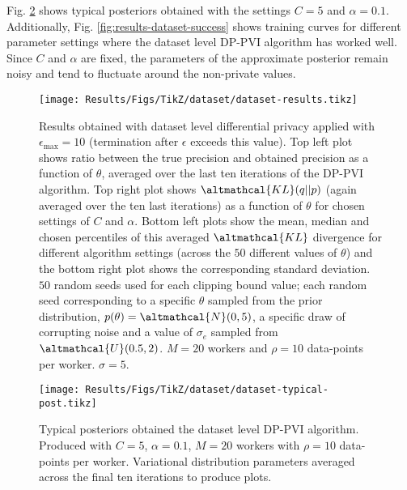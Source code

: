 Fig. \ref{fig:results-dataset-typical-post} shows typical posteriors obtained with the settings $C = 5$ and $\alpha = 0.1$. Additionally, Fig. \ref{fig:results-dataset-success} shows training curves for different parameter settings where the dataset level DP-PVI algorithm has worked well. Since $C$ and $\alpha$ are fixed, the parameters of the approximate posterior remain noisy and tend to fluctuate around the non-private values. 

\begin{figure}
	\texttt{[image: Results/Figs/TikZ/dataset/dataset-results.tikz]}
	\centering
	\caption{\label{fig:results-dataset-results} Results obtained with dataset level differential privacy applied with $\epsilon_\text{max} = 10$ (termination after $\epsilon$ exceeds this value). Top left plot shows ratio between the true precision and obtained precision as a function of $\theta$, averaged over the last ten iterations of the DP-PVI algorithm. Top right plot shows $\altmathcal{KL}(q||p)$ (again averaged over the ten last iterations) as a function of $\theta$ for chosen settings of $C$ and $\alpha$. Bottom left plots show the mean, median and chosen percentiles of this averaged $\altmathcal{KL}$ divergence for different algorithm settings (across the $50$ different values of $\theta$) and the bottom right plot shows the corresponding standard deviation. $50$ random seeds used for each clipping bound value; each random seed corresponding to a specific $\theta$ sampled from the prior distribution, $p(\theta) = \altmathcal{N}(0, 5)$, a specific draw of corrupting noise and a value of $\sigma_e$ sampled from $\altmathcal{U}(0.5, 2)$. $M=20$ workers and $\rho = 10$ data-points per worker. $\sigma=5$. }
\end{figure}

\begin{figure}
	\texttt{[image: Results/Figs/TikZ/dataset/dataset-typical-post.tikz]}
	\centering
	\caption{\label{fig:results-dataset-typical-post} Typical posteriors obtained the dataset level DP-PVI algorithm. Produced with $C=5$, $\alpha=0.1$, $M=20$ workers with $\rho = 10$ data-points per worker. Variational distribution parameters averaged across the final ten iterations to produce plots. }
\end{figure}

